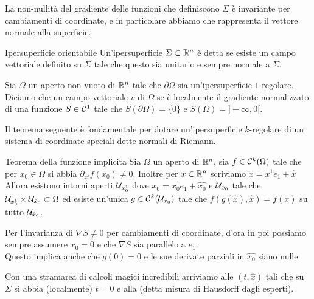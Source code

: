 \documentclass{article}
\begin{document}
\begin{remark}{}{}
    La non-nullità del gradiente delle funzioni che definiscono $\Sigma$ è invariante per cambiamenti di coordinate, e in particolare abbiamo che rappresenta il vettore normale alla superficie.
\end{remark}

\begin{definition}{Ipersuperficie orientabile}{}
    Un'ipersuperficie $\Sigma\subset\mathbb{R}^n$ è detta  se esiste un campo vettoriale definito su $\Sigma$ tale che questo sia unitario e sempre normale a $\Sigma$. 
\end{definition}

\begin{definition}{}{}
    Sia $\Omega$ un aperto non vuoto di $\mathbb{R}^n$ tale che $\partial\Omega$ sia un'ipersuperficie $1$-regolare.\\
    Diciamo che un campo vettoriale $v$  di $\Omega$ se è localmente il gradiente normalizzato di una funzione $S\in\mathcal{C}^1$  tale che $S(\partial\Omega) = \{0\}$ e $S(\Omega) = ]-\infty,0[$.
\end{definition}

Il teorema seguente è fondamentale per dotare un'ipersuperficie $k$-regolare di un sistema di coordinate speciali dette normali di Riemann.

\begin{theorem}{Teorema della funzione implicita}{}
    Sia $\Omega$ un aperto di $\mathbb{R}^n$, sia $f \in \mathcal{C}^k(\Omega)$ tale che per $x_0 \in \Omega$ si abbia $\partial_{x^i} f(x_0)\neq 0$. Inoltre per $x\in\mathbb{R}^n$ scriviamo $x = x^1e_1 + \hat{x}$\\
    Allora esistono intorni aperti $\mathcal{U}_{x_0^1}$ dove $x_0 = x_0^1 e_1 + \hat{x_0}$ e $\mathcal{U}_{\hat{x}_0}$ tale che $\mathcal{U}_{x_0^1}\times\mathcal{U}_{\hat{x}_0}\subset\Omega $ ed esiste un'unica $g\in\mathcal{C}^k(\mathcal{U}_{\hat{x}_0})$ tale che $f(g(\hat{x}),\hat{x}) = f(x)$ su tutto $\mathcal{U}_{\hat{x}_0}$.
\end{theorem}

\begin{remark}{}{}
    Per l'invarianza di $\nabla S \neq 0$ per cambiamenti di coordinate, d'ora in poi possiamo sempre assumere $x_0 = 0$ e che $\nabla S$ sia parallelo a $e_1$.\\
    Questo implica anche che $g(0)=0$ e le sue derivate parziali in $\hat{x_0}$ siano nulle
\end{remark}

Con una stramarea di calcoli magici incredibili arriviamo alle  $(t,\hat{x})$ tali che su $\Sigma$ si abbia (localmente) $t=0$ e alla  (detta misura di Hausdorff dagli esperti). 
\end{document}

